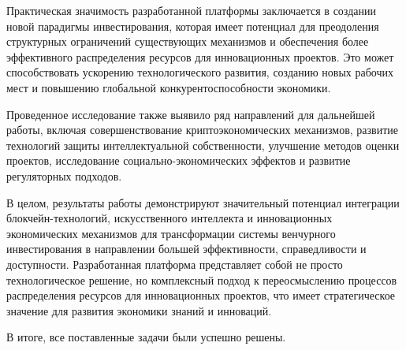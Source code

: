 \documentclass[
    14pt,
    specialist,
    candidate, %
    subf, %
    href,
    dotsinheaders=false
]{disser}
\begin{document}
Практическая значимость разработанной платформы заключается в создании новой парадигмы инвестирования, которая имеет потенциал для преодоления структурных ограничений существующих механизмов и обеспечения более эффективного распределения ресурсов для инновационных проектов. Это может способствовать ускорению технологического развития, созданию новых рабочих мест и повышению глобальной конкурентоспособности экономики.

Проведенное исследование также выявило ряд направлений для дальнейшей работы, включая совершенствование криптоэкономических механизмов, развитие технологий защиты интеллектуальной собственности, улучшение методов оценки проектов, исследование социально-экономических эффектов и развитие регуляторных подходов.

В целом, результаты работы демонстрируют значительный потенциал интеграции блокчейн-технологий, искусственного интеллекта и инновационных экономических механизмов для трансформации системы венчурного инвестирования в направлении большей эффективности, справедливости и доступности. Разработанная платформа представляет собой не просто технологическое решение, но комплексный подход к переосмыслению процессов распределения ресурсов для инновационных проектов, что имеет стратегическое значение для развития экономики знаний и инноваций.

В итоге, все поставленные задачи были успешно решены.

\renewcommand{\bibname}{\fontsize{14pt}{21pt}\selectfont СПИСОК ИСПОЛЬЗОВАННЫХ ИСТОЧНИКОВ}


\end{document}
